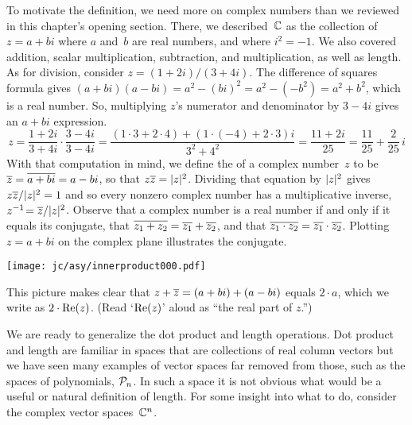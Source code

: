 To motivate the definition, 
we need more on complex numbers than we reviewed in this 
chapter's opening section.
There, we described~$\mathbb{C}$ as 
the collection of $z=a+bi$ where $a$ and~$b$ are real numbers,
and where $i^2=-1$. 
We also covered addition, scalar multiplication,
subtraction, and multiplication, as well as length.
As for division,  consider $z=(1+2i)/(3+4i)$.
The difference of squares formula
gives $(a+bi)(a-bi)=a^2-(bi)^2=a^2-(-b^2)=a^2+b^2$,
which is a real number.
So, 
multiplying $z$'s numerator and denominator by $3-4i$
gives an $a+bi$ expression.
\begin{equation*}
  z=\frac{1+2i}{3+4i}\cdot\frac{3-4i}{3-4i}
  =
  \frac{(1\cdot 3+2\cdot 4)+(1\cdot (-4)+2\cdot 3)i}{3^2+4^2}
  =
  \frac{11+2i}{25}
  =
  \frac{11}{25}+\frac{2}{25}\,i
\end{equation*}
With that computation in mind, we
define the  of a complex number~$z$
to be $\overline{z}=\overline{a+bi}=a-bi$, so that $z\overline{z}=\lvert z\rvert^2$.
Dividing that equation by $\lvert z\rvert^2$ gives $z\overline{z}/\lvert z\rvert^2=1$
and so  
every nonzero complex number has a multiplicative inverse,
$z^{-1}\!=\overline{z}/\lvert z\rvert^2$.
Observe that a complex number is a real number if and only if 
it equals its conjugate, 
that $\overline{z_1+z_2}=\overline{z_1}+\overline{z_2}$,
and that $\overline{z_1\cdot z_2}=\overline{z_1}\cdot\overline{z_2}$.
Plotting $z=a+bi$ on the 
complex plane 
illustrates the conjugate.
\begin{center}
  \texttt{[image: jc/asy/innerproduct000.pdf]}
\end{center}
This picture makes clear that 
$z+\overline{z}=(a+bi)+(a-bi)$ equals
$2\cdot a$, which we write as $2\cdot\mathrm{Re}(z)$.
(Read `$\mathrm{Re}(z)$' aloud as ``the real part of $z$.'')

We are ready to generalize the dot product and length operations. 
Dot product and length are familiar in spaces that are collections of real column vectors but we have seen many examples of 
vector spaces far removed from those, such as 
the spaces of polynomials, $\mathcal{P}_n$. 
In such a space it is not obvious
what would be a useful or natural definition of length.
For some insight into what to do,
consider the complex vector spaces~$\mathbb{C}^n$.

